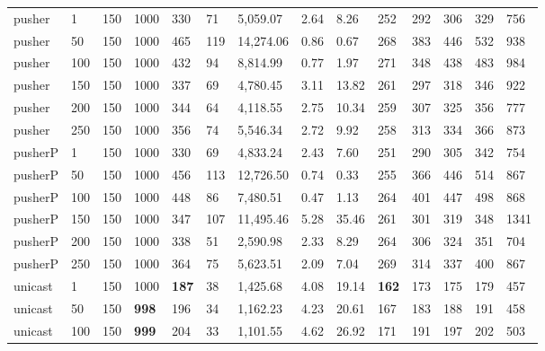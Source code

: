 \begin{table}[!htb]
\begin{tabular}{llllllllllllll}
		pusher     & 1            & 150   & 1000 & 330   & 71   & 5,059.07      & 2.64     & 8.26     & 252  & 292  & 306   & 329   & 756   \\
		pusher     & 50           & 150   & 1000 & 465   & 119  & 14,274.06     & 0.86     & 0.67     & 268  & 383  & 446   & 532   & 938   \\
		pusher     & 100          & 150   & 1000 & 432   & 94   & 8,814.99      & 0.77     & 1.97     & 271  & 348  & 438   & 483   & 984   \\
		pusher     & 150          & 150   & 1000 & 337   & 69   & 4,780.45      & 3.11     & 13.82    & 261  & 297  & 318   & 346   & 922   \\
		pusher     & 200          & 150   & 1000 & 344   & 64   & 4,118.55      & 2.75     & 10.34    & 259  & 307  & 325   & 356   & 777   \\
		pusher     & 250          & 150   & 1000 & 356   & 74   & 5,546.34      & 2.72     & 9.92     & 258  & 313  & 334   & 366   & 873   \\ \hline
		pusherP & 1            & 150   & 1000 & 330   & 69   & 4,833.24      & 2.43     & 7.60     & 251  & 290  & 305   & 342   & 754   \\
		pusherP & 50           & 150   & 1000 & 456   & 113  & 12,726.50     & 0.74     & 0.33     & 255  & 366  & 446   & 514   & 867   \\
		pusherP & 100          & 150   & 1000 & 448   & 86   & 7,480.51      & 0.47     & 1.13     & 264  & 401  & 447   & 498   & 868   \\
		pusherP & 150          & 150   & 1000 & 347   & 107  & 11,495.46     & 5.28     & 35.46    & 261  & 301  & 319   & 348   & 1341  \\
		pusherP & 200          & 150   & 1000 & 338   & 51   & 2,590.98      & 2.33     & 8.29     & 264  & 306  & 324   & 351   & 704   \\
		pusherP & 250          & 150   & 1000 & 364   & 75   & 5,623.51      & 2.09     & 7.04     & 269  & 314  & 337   & 400   & 867   \\ \hline
		unicast & 1            & 150   & 1000 & \textbf{187}   & 38   & 1,425.68      & 4.08     & 19.14    & \textbf{162}  & 173  & 175   & 179   & 457   \\
		unicast & 50           & 150   & \textbf{998}  & 196   & 34   & 1,162.23      & 4.23     & 20.61    & 167  & 183  & 188   & 191   & 458   \\
		unicast & 100          & 150   & \textbf{999}  & 204   & 33   & 1,101.55      & 4.62     & 26.92    & 171  & 191  & 197   & 202   & 503   \\

\end{tabular}
\end{table}

